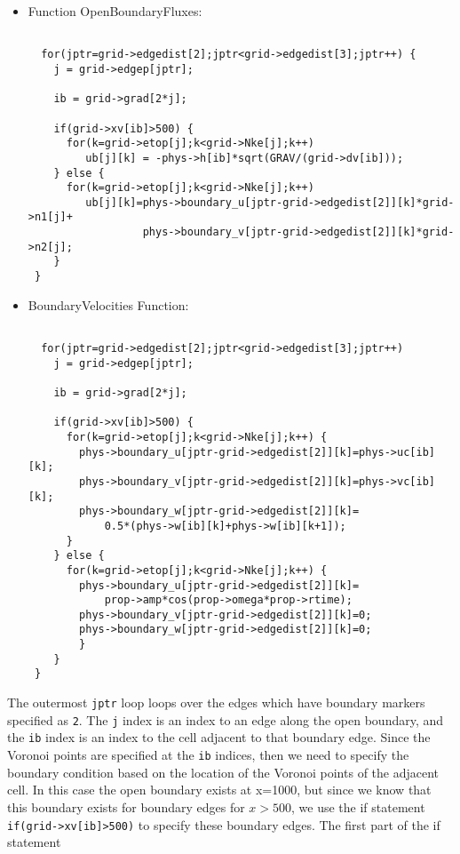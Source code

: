 \begin{itemize}
\item Function OpenBoundaryFluxes:
\begin{verbatim}

  for(jptr=grid->edgedist[2];jptr<grid->edgedist[3];jptr++) {
    j = grid->edgep[jptr];

    ib = grid->grad[2*j];

    if(grid->xv[ib]>500) {
      for(k=grid->etop[j];k<grid->Nke[j];k++) 
         ub[j][k] = -phys->h[ib]*sqrt(GRAV/(grid->dv[ib]));
    } else {
      for(k=grid->etop[j];k<grid->Nke[j];k++) 
         ub[j][k]=phys->boundary_u[jptr-grid->edgedist[2]][k]*grid->n1[j]+
                  phys->boundary_v[jptr-grid->edgedist[2]][k]*grid->n2[j];
    }
 }

\end{verbatim}
\item BoundaryVelocities Function:
\begin{verbatim}

  for(jptr=grid->edgedist[2];jptr<grid->edgedist[3];jptr++) 
    j = grid->edgep[jptr];

    ib = grid->grad[2*j];

    if(grid->xv[ib]>500) {
      for(k=grid->etop[j];k<grid->Nke[j];k++) {
        phys->boundary_u[jptr-grid->edgedist[2]][k]=phys->uc[ib][k];
        phys->boundary_v[jptr-grid->edgedist[2]][k]=phys->vc[ib][k];
        phys->boundary_w[jptr-grid->edgedist[2]][k]=
            0.5*(phys->w[ib][k]+phys->w[ib][k+1]);
      } 
    } else {
      for(k=grid->etop[j];k<grid->Nke[j];k++) {
        phys->boundary_u[jptr-grid->edgedist[2]][k]=
            prop->amp*cos(prop->omega*prop->rtime);
        phys->boundary_v[jptr-grid->edgedist[2]][k]=0;
        phys->boundary_w[jptr-grid->edgedist[2]][k]=0;
        } 
    }
 }

\end{verbatim}
\end{itemize}
The outermost \verb+jptr+ loop loops over the edges which have boundary markers specified as \verb+2+.
The \verb+j+ index is an index to an edge along the open boundary, and 
the \verb+ib+ index is an index to the cell adjacent to that boundary edge.  Since the Voronoi points
are specified at the \verb+ib+ indices, then we need to specify the boundary condition based on
the location of the Voronoi points of the adjacent cell.  In this case the open boundary exists at x=1000, but since
we know that this boundary exists for boundary edges for $x>500$, we use the if statement
\verb+if(grid->xv[ib]>500)+ to specify these boundary edges.  The first part of the if statement
